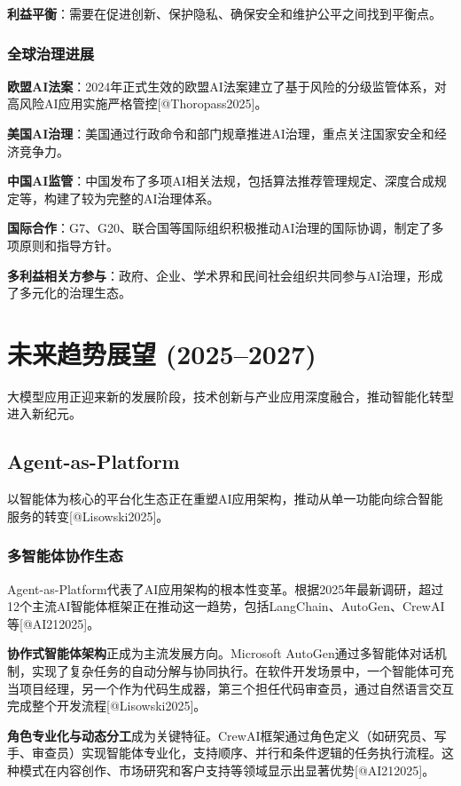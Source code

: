 \documentclass{article}
\begin{document}
\textbf{利益平衡}：需要在促进创新、保护隐私、确保安全和维护公平之间找到平衡点。

\subsubsection{全球治理进展}
\textbf{欧盟AI法案}：2024年正式生效的欧盟AI法案建立了基于风险的分级监管体系，对高风险AI应用实施严格管控[@Thoropass2025]。

\textbf{美国AI治理}：美国通过行政命令和部门规章推进AI治理，重点关注国家安全和经济竞争力。

\textbf{中国AI监管}：中国发布了多项AI相关法规，包括算法推荐管理规定、深度合成规定等，构建了较为完整的AI治理体系。

\textbf{国际合作}：G7、G20、联合国等国际组织积极推动AI治理的国际协调，制定了多项原则和指导方针。

\textbf{多利益相关方参与}：政府、企业、学术界和民间社会组织共同参与AI治理，形成了多元化的治理生态。

\section{未来趋势展望 (2025–2027)}
大模型应用正迎来新的发展阶段，技术创新与产业应用深度融合，推动智能化转型进入新纪元。

\subsection{Agent-as-Platform}
以智能体为核心的平台化生态正在重塑AI应用架构，推动从单一功能向综合智能服务的转变[@Lisowski2025]。

\subsubsection{多智能体协作生态}
Agent-as-Platform代表了AI应用架构的根本性变革。根据2025年最新调研，超过12个主流AI智能体框架正在推动这一趋势，包括LangChain、AutoGen、CrewAI等[@AI212025]。

\textbf{协作式智能体架构}正成为主流发展方向。Microsoft AutoGen通过多智能体对话机制，实现了复杂任务的自动分解与协同执行。在软件开发场景中，一个智能体可充当项目经理，另一个作为代码生成器，第三个担任代码审查员，通过自然语言交互完成整个开发流程[@Lisowski2025]。

\textbf{角色专业化与动态分工}成为关键特征。CrewAI框架通过角色定义（如研究员、写手、审查员）实现智能体专业化，支持顺序、并行和条件逻辑的任务执行流程。这种模式在内容创作、市场研究和客户支持等领域显示出显著优势[@AI212025]。
\end{document}
